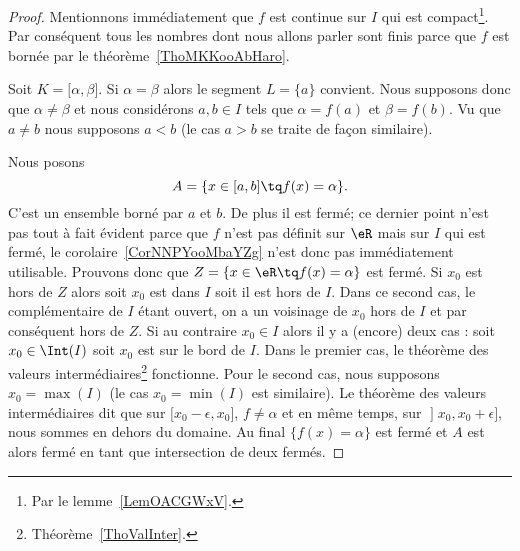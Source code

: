 \begin{proof}
	Mentionnons immédiatement que \( f\) est continue sur \( I\) qui est compact\footnote{Par le lemme~\ref{LemOACGWxV}.}. Par conséquent tous les nombres dont nous allons parler sont finis parce que \( f\) est bornée par le théorème~\ref{ThoMKKooAbHaro}.

	Soit \( K=\mathopen[ \alpha , \beta \mathclose]\). Si \( \alpha=\beta\) alors le segment \( L=\{ a \}\) convient. Nous supposons donc que \( \alpha\neq \beta\) et nous considérons \( a,b\in I\) tels que \( \alpha=f(a)\) et \( \beta=f(b)\). Vu que \( a\neq b\) nous supposons \( a<b\) (le cas \( a>b\) se traite de façon similaire).

	Nous posons
	\begin{equation}
		A=\{ x\in\mathopen[ a , b \mathclose]\tq f(x)=\alpha \}.
	\end{equation}
	C'est un ensemble borné par \( a\) et \( b\). De plus il est fermé; ce dernier point n'est pas tout à fait évident parce que \( f\) n'est pas définit sur \( \eR\) mais sur \( I\) qui est fermé, le corolaire~\ref{CorNNPYooMbaYZg} n'est donc pas immédiatement utilisable. Prouvons donc que \( Z=\{ x\in \eR\tq f(x)=\alpha \}\) est fermé. Si \( x_0\) est hors de \( Z\) alors soit \( x_0\) est dans \( I\) soit il est hors de \( I\). Dans ce second cas, le complémentaire de \( I\) étant ouvert, on a un voisinage de \( x_0\) hors de \( I\) et par conséquent hors de \( Z\). Si au contraire \( x_0\in I\) alors il y a (encore) deux cas : soit \( x_0\in\Int(I)\) soit \( x_0\) est sur le bord de \( I\). Dans le premier cas, le théorème des valeurs intermédiaires\footnote{Théorème~\ref{ThoValInter}.} fonctionne. Pour le second cas, nous supposons \( x_0=\max(I)\) (le cas \( x_0=\min(I)\) est similaire). Le théorème des valeurs intermédiaires dit que sur \( \mathopen[ x_0-\epsilon , x_0 \mathclose]\), \( f\neq \alpha\) et en même temps, sur \( \mathopen] x_0 , x_0+\epsilon \mathclose]\), nous sommes en dehors du domaine. Au final \( \{ f(x)=\alpha \}\) est fermé et \( A\) est alors fermé en tant que intersection de deux fermés.


\end{proof}
